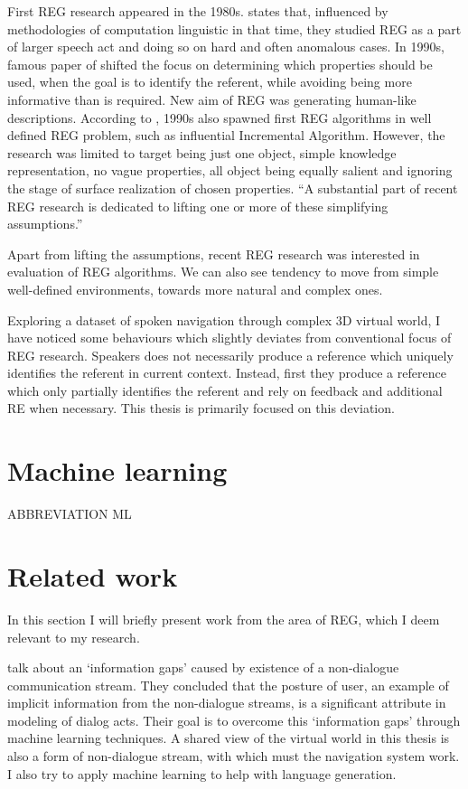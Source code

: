 First REG research appeared in the 1980s. \citet{krahmer2012computational} states that, influenced by methodologies of computation linguistic in that time, they studied REG as a part of larger speech act and doing so on hard and often anomalous cases. In 1990s, famous paper of \citet{dale1995computational} shifted the focus on determining which properties should be used, when the goal is to identify the referent, while avoiding being more informative than is required. New aim of REG was generating human-like descriptions.  According to  \citet{krahmer2012computational}, 1990s also spawned first REG algorithms in well defined REG problem, such as influential Incremental Algorithm. However, the research was limited to target being just one object, simple knowledge representation, no vague properties, all object being equally salient and ignoring the stage of surface realization of chosen properties. ``A substantial part of recent REG research is dedicated to lifting one or more of these simplifying assumptions.'' \citep{krahmer2012computational} 

Apart from lifting the assumptions, recent REG research was interested in evaluation of REG algorithms. We can also see tendency to move from simple well-defined environments, towards more natural and complex ones.

Exploring a dataset of spoken navigation through complex 3D virtual world, I have noticed some behaviours which slightly deviates from conventional focus of REG research. Speakers does not necessarily produce a reference which uniquely identifies the referent in current context. Instead, first they produce a reference which only partially identifies the referent and rely on feedback and additional RE when necessary. This thesis is primarily focused on this deviation.

\section{Machine learning}
ABBREVIATION ML

\section{Related work}
\label{sec:relwork}
In this section I will briefly present work from the area of REG, which I deem relevant to my research.

\citet{ha2012combining} talk about an `information gaps' caused by existence of a non-dialogue communication stream. They concluded that the posture of user, an example of implicit information from the non-dialogue streams, is a significant attribute in modeling of dialog acts. Their goal is to overcome this `information gaps' through machine learning techniques. A shared view of the virtual world in this thesis is also a form of non-dialogue stream, with which must the navigation system work. I also try to apply machine learning to help with language generation.

